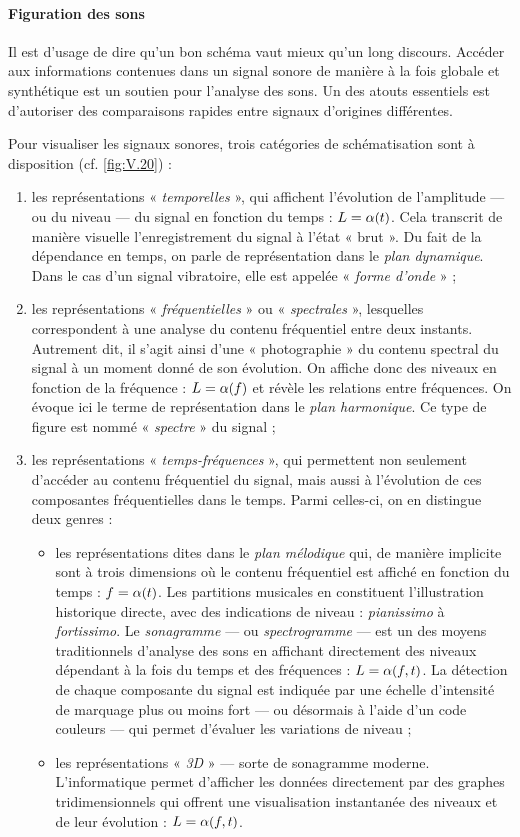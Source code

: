 \paragraph{Figuration des sons} Il est d'usage de dire qu'un bon schéma vaut mieux qu'un long discours. Accéder aux informations contenues dans un signal sonore de manière à la fois globale et synthétique est un soutien pour l'analyse des sons. Un des atouts essentiels est d'autoriser des comparaisons rapides entre signaux d'origines différentes.

Pour visualiser les signaux sonores, trois catégories de schématisation sont à disposition (cf. \cref{fig:V.20}) :
\begin{enumerate}
	\item les représentations « \emph{temporelles} », qui affichent l'évolution de l'amplitude --- ou du niveau --- du signal en fonction du temps : $L = \alpha\mbox{\small (} t \mbox{\small )}$. Cela transcrit de manière visuelle l'enregistrement du signal à l'état « brut ». Du fait de la dépendance en temps, on parle de représentation dans le \emph{plan dynamique}. Dans le cas d'un signal vibratoire, elle est appelée « \emph{forme d'onde} » ;
	\item les représentations « \emph{fréquentielles} » ou « \emph{spectrales} », lesquelles correspondent à une analyse du contenu fréquentiel entre deux instants. Autrement dit, il s'agit ainsi d'une « photographie » du contenu spectral du signal à un moment donné de son évolution. On affiche donc des niveaux en fonction de la fréquence : $L = \alpha\mbox{\small (} f \mbox{\small )}$ et révèle les relations entre fréquences. On évoque ici le terme de représentation dans le \emph{plan harmonique}. Ce type de figure est nommé « \emph{spectre} » du signal ;   
	\item les représentations « \emph{temps-fréquences} », qui permettent non seulement d'accéder au contenu fréquentiel du signal, mais aussi à l'évolution de ces composantes fréquentielles dans le temps. Parmi celles-ci, on en distingue deux genres :
\begin{itemize}
	\item les représentations dites dans le \emph{plan mélodique} qui, de manière implicite sont à trois dimensions où le contenu fréquentiel est affiché en fonction du temps : $f = \alpha\mbox{\small (} t \mbox{\small )}$. Les partitions musicales en constituent l'illustration historique directe, avec des indications de niveau : \textit{pianissimo} à \textit{fortissimo}.
Le \emph{sonagramme} --- ou \emph{spectrogramme} --- est un des moyens traditionnels d'analyse des sons en affichant directement des niveaux dépendant à la fois du temps et des fréquences : $L = \alpha\mbox{\small (} f,t \mbox{\small )}$. La détection de chaque composante du signal est indiquée par une échelle d'intensité de marquage plus ou moins fort --- ou désormais à l'aide d'un code couleurs --- qui permet d'évaluer les variations de niveau ;
	\item les représentations « \emph{3D} » --- sorte de sonagramme moderne. L'informatique permet d'afficher les données directement par des graphes tridimensionnels qui offrent une visualisation instantanée des niveaux et de leur évolution : $L = \alpha\mbox{\small (} f,t \mbox{\small )}$. 
\end{itemize}
\end{enumerate}

